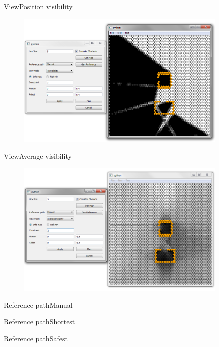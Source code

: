 \begin{frame}{View}{Position visibility}

\begin{figure}
\centering
\includegraphics[width = 0.9\textwidth]{./screenshot/position_visibility_view2.png}
\end{figure}

\end{frame}

\begin{frame}{View}{Average visibility}

\begin{figure}
\centering
\includegraphics[width = 0.9\textwidth]{./screenshot/average_visibility_view.png}
\end{figure}

\end{frame}

\begin{frame}{Reference path}{Manual}


\end{frame}

\begin{frame}{Reference path}{Shortest}


\end{frame}

\begin{frame}{Reference path}{Safest}


\end{frame}